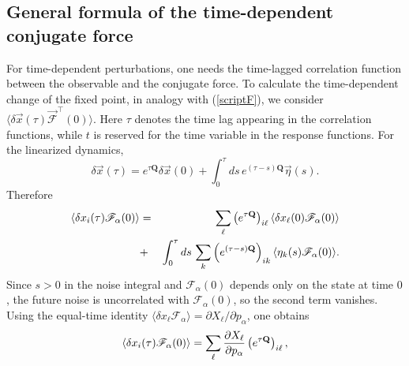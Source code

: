 \subsection{General formula of the time-dependent conjugate force}
\quad For time-dependent perturbations, one needs the time-lagged correlation function between the observable and the conjugate force. To calculate the time-dependent change of the fixed point, in analogy with (\ref{scriptF}), we consider $\langle \delta \vec{x}(\tau) \vec{\mathscr{F}}^\intercal(0) \rangle$. Here $\tau$ denotes the time lag appearing in the correlation functions, while $t$ is reserved for the time variable in the response functions. For the linearized dynamics,
\begin{equation}
    \delta \vec{x}(\tau)=e^{\tau \mathbf{Q}} \delta \vec{x}(0)+ \int_0^\tau ds\, e^{(\tau-s)\mathbf{Q}}\vec{\eta}(s).
\end{equation}
Therefore
\begin{eqnarray}
    \langle \delta x_i(\tau) {\mathscr F}_\alpha(0)\rangle &=& \sum_{\ell} \left( e^{\tau{\bf Q}} \right)_{i\ell}\langle \delta x_\ell(0) {\mathscr F}_\alpha(0)\rangle \nonumber\\
    &+&\int_0^\tau ds\, \sum_k \left( e^{(\tau-s){\bf Q}} \right)_{ik}\langle \eta_k(s) {\mathscr F}_\alpha(0)\rangle.
\end{eqnarray}
Since $s>0$ in the noise integral and ${\mathscr F}_\alpha(0)$ depends only on the state at time $0$, the future noise is uncorrelated with ${\mathscr F}_\alpha(0)$, so the second term vanishes. Using the equal-time identity $\langle \delta x_\ell {\mathscr F}_\alpha \rangle=\partial X_\ell/\partial p_\alpha$, one obtains
\begin{equation}
    \langle \delta x_i(\tau) {\mathscr F}_\alpha(0)\rangle= \sum_{\ell} \frac{\partial X_\ell}{\partial p_\alpha}
\left( e^{\tau{\bf Q}} \right)_{i\ell}, \label{dxtauscrF}
\end{equation}
